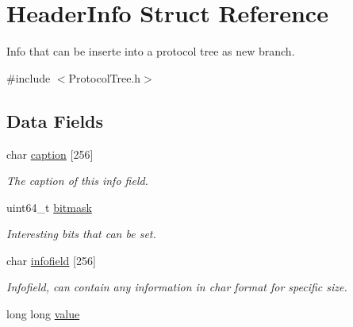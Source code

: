 \hypertarget{struct_header_info}{\section{Header\-Info Struct Reference}
\label{struct_header_info}
}


Info that can be inserte into a protocol tree as new branch.  




{\ttfamily \#include $<$Protocol\-Tree.\-h$>$}

\subsection*{Data Fields}
\begin{DoxyCompactItemize}
\item 
\hypertarget{struct_header_info_a3edb66de361cd1c4685a77a4b5864b19}{char \hyperlink{struct_header_info_a3edb66de361cd1c4685a77a4b5864b19}{caption} \mbox{[}256\mbox{]}}\label{struct_header_info_a3edb66de361cd1c4685a77a4b5864b19}

\begin{DoxyCompactList}\small\item\em The caption of this info field. \end{DoxyCompactList}\item 
\hypertarget{struct_header_info_a427985c4a3b001b3c609e05807fec939}{uint64\-\_\-t \hyperlink{struct_header_info_a427985c4a3b001b3c609e05807fec939}{bitmask}}\label{struct_header_info_a427985c4a3b001b3c609e05807fec939}

\begin{DoxyCompactList}\small\item\em Interesting bits that can be set. \end{DoxyCompactList}\item 
\hypertarget{struct_header_info_a8a809f30e126c326199fac2aa5515853}{char \hyperlink{struct_header_info_a8a809f30e126c326199fac2aa5515853}{infofield} \mbox{[}256\mbox{]}}\label{struct_header_info_a8a809f30e126c326199fac2aa5515853}

\begin{DoxyCompactList}\small\item\em Infofield, can contain any information in char format for specific size. \end{DoxyCompactList}\item 
\hypertarget{struct_header_info_ae31cfcff621037c9cc0ed8180401aeb8}{long long \hyperlink{struct_header_info_ae31cfcff621037c9cc0ed8180401aeb8}{value}}\label{struct_header_info_ae31cfcff621037c9cc0ed8180401aeb8}


\end{DoxyCompactItemize}
